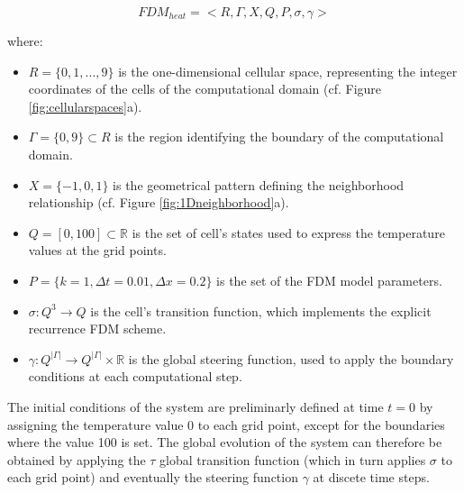     $$ FDM_{heat} = <R,\Gamma,X,Q,P,\sigma,\gamma>$$

    \noindent where:

    \begin{itemize}

    \item $R = \{0,1,...,9\}$ is the one-dimensional cellular space,
      representing the integer coordinates of the cells of the
      computational domain (cf. Figure \ref{fig:cellularspaces}a).

    \item $\Gamma = \{0, 9\} \subset R$ is the region identifying the
      boundary of the computational domain.


    \item $X = \{-1, 0, 1\}$ is the geometrical pattern defining the
      neighborhood relationship (cf. Figure
      \ref{fig:1Dneighborhood}a).

    \item $Q = [0, 100] \subset \mathbb{R}$ is the set of cell's
      states used to express the temperature values at the grid
      points.

    \item $P = \{k = 1, \Delta t = 0.01, \Delta x = 0.2\}$ is the set
      of the FDM model parameters.
      
    \item $\sigma : Q^3 \rightarrow Q$ is the cell's transition
      function, which implements the explicit recurrence FDM scheme.

    \item $\gamma: Q^{|\Gamma|} \rightarrow Q^{|\Gamma|} \times
      \mathbb{R}$ is the global steering function, used to apply the
      boundary conditions at each computational step.

    \end{itemize}

    The initial conditions of the system are preliminarly defined at
    time $t=0$ by assigning the temperature value 0 to each grid
    point, except for the boundaries where the value 100 is set. The
    global evolution of the system can therefore be obtained by
    applying the $\tau$ global transition function (which in turn
    applies $\sigma$ to each grid point) and eventually the steering
    function $\gamma$ at discete time steps.
    
    
    
    
    
        

